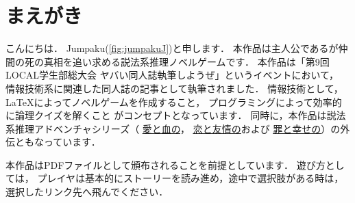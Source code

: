 \section*{まえがき}
こんにちは．
Jumpaku(\ref{fig:jumpakuJ})と申します．
本作品は主人公であるが仲間の死の真相を追い求める説法系推理ノベルゲームです．
本作品は「第9回LOCAL学生部総大会 ヤバい同人誌執筆しようぜ」というイベントにおいて，
情報技術系に関連した同人誌の記事として執筆されました．
情報技術として，\LaTeX によってノベルゲームを作成すること，
プログラミングによって効率的に論理クイズを解くこと
がコンセプトとなっています．
同時に，本作品は説法系推理アドベンチャシリーズ（
\href{http://jumpaku.hatenablog.com/entry/2016/04/14/002437}{\underline{愛と血の}}，
\href{http://jumpaku.hatenablog.com/entry/2016/07/24/032632}{\underline{恋と友情の}}および
\href{http://jumpaku.hatenablog.com/entry/2017/07/24/044918}{\underline{罪と幸せの}}）の外伝ともなっています．

本作品はPDFファイルとして頒布されることを前提としています．
遊び方としては，
プレイヤは基本的にストーリーを読み進め，途中で選択肢がある時は，選択したリンク先へ飛んでください．

